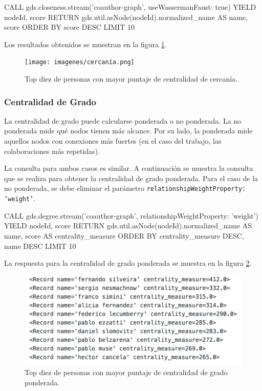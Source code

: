 \documentclass[journal]{IEEEtran}
\begin{document}
\begin{sflisting}[style=sparql,caption= Centralidad de Cercanía,label=cercania]
	CALL gds.closeness.stream('coauthor-graph',
	{useWassermanFaust: true})
	YIELD nodeId, score
	RETURN gds.util.asNode(nodeId).normalized_name
	AS name, score
	ORDER BY score DESC
	LIMIT 10
\end{sflisting}

Los resultados obtenidos se muestran en la figura \ref{fig:cercania}.

\begin{figure}[htb]
	\centering
	\texttt{[image: imagenes/cercanía.png]}
	\caption{Top diez de personas con mayor puntaje de centralidad de cercanía.}
	\label{fig:cercania}
\end{figure}

\subsubsection{Centralidad de Grado}

La centralidad de grado puede calcularse ponderada o no ponderada. La no ponderada mide qué nodos tienen más alcance. Por su lado, la ponderada mide aquellos nodos con conexiones más fuertes (en el caso del trabajo, las colaboraciones más repetidas).

La consulta para ambos casos es similar. A continuación se muestra la consulta que se realiza para obtener la centralidad de grado ponderada. Para el caso de la no ponderada, se debe eliminar el parámetro \texttt{{relationshipWeightProperty: 'weight'}}.

\begin{sflisting}[style=sparql,caption= Centralidad de Grado,label=grado_ponderado]
	CALL gds.degree.stream('coauthor-graph',
	{relationshipWeightProperty: 'weight'})
	YIELD nodeId, score
	RETURN gds.util.asNode(nodeId).normalized_name AS name,
	score AS centrality_measure
	ORDER BY centrality_measure DESC, name DESC
	LIMIT 10
\end{sflisting}

La respuesta para la centralidad de grado ponderada se muestra en la figura \ref{fig:grado_ponderada}.

\begin{figure}[htb]
	\centering
	\includegraphics[width=\linewidth]{imagenes/pesos_grado.png}
	\caption{Top diez de personas con mayor puntaje de centralidad de grado ponderada.}
	\label{fig:grado_ponderada}
\end{figure}
\end{document}
